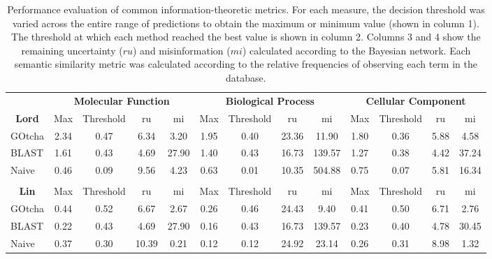 \begin{table}[t]
\caption[Performance evaluation of common information-theoretic metrics]{Performance evaluation of common information-theoretic metrics. For each measure, the decision threshold was varied across the entire range of predictions to obtain the maximum or minimum value (shown in column 1). The threshold at which each method reached the best value is shown in column 2. Columns 3 and 4 show the remaining uncertainty ($ru$) and misinformation ($mi$) calculated according to the Bayesian network. Each semantic similarity metric was calculated according to the relative frequencies of observing each term in the database. 
\label{tab:rumi1_1}}
\resizebox{\columnwidth}{!}
{\begin{tabular}{c|cccc|cccc|cccc}

\multicolumn{1}{l}{\hphantom} &\multicolumn{4}{c}{\bf Molecular Function } & \multicolumn{4}{c}{\bf Biological Process} &  \multicolumn{4}{c}{\bf Cellular Component } \\

\bf Lord & Max & Threshold & ru & mi & Max & Threshold & ru & mi & Max & Threshold & ru & mi\\
\hline
\multicolumn{1}{l|}{GOtcha}& 2.34 & 0.47 & 6.34 & 3.20 & 1.95 & 0.40 & 23.36 & 11.90 & 1.80 & 0.36 & 5.88 & 4.58 \\
\multicolumn{1}{l|}{BLAST}& 1.61 & 0.43 & 4.69 & 27.90 & 1.40 & 0.43 & 16.73 & 139.57 & 1.27 & 0.38 & 4.42 & 37.24 \\
\multicolumn{1}{l|}{Naive}& 0.46 & 0.09 & 9.56 & 4.23 & 0.63 & 0.01 & 10.35 & 504.88 & 0.75 & 0.07 & 5.81 & 16.34 \\


\multicolumn{1}{l}{\hphantom} & & & &\multicolumn{1}{c}{\hphantom} & & & & \multicolumn{1}{c}{\hphantom} & & & &\\

\bf Lin & Max & Threshold & ru & mi & Max & Threshold & ru & mi & Max & Threshold & ru & mi\\
\hline
\multicolumn{1}{l|}{GOtcha}& 0.44 & 0.52 & 6.67 & 2.67 & 0.26 & 0.46 & 24.43 & 9.40 & 0.41 & 0.50 & 6.71 & 2.76 \\
\multicolumn{1}{l|}{BLAST}& 0.22 & 0.43 & 4.69 & 27.90 & 0.16 & 0.43 & 16.73 & 139.57 & 0.23 & 0.40 & 4.78 & 30.45 \\
\multicolumn{1}{l|}{Naive}& 0.37 & 0.30 & 10.39 & 0.21 & 0.12 & 0.12 & 24.92 & 23.14 & 0.26 & 0.31 & 8.98 & 1.32 \\


\end{tabular}}
\end{table}
